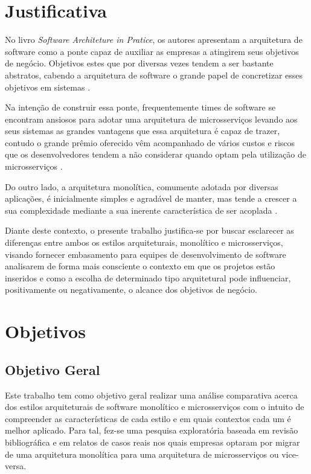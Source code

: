 \section{Justificativa}
\label{justificativa}

No livro \textit{Software Architeture in Pratice}, os autores 
apresentam a arquitetura de software como a ponte capaz de auxiliar as empresas a atingirem seus
objetivos de negócio. Objetivos estes que por diversas vezes tendem a ser bastante abstratos,
cabendo a arquitetura de software o grande papel de concretizar esses objetivos em sistemas
\cite{Bass2015:SoftwareArchitetureInPratice}.

Na intenção de construir essa ponte, frequentemente times de software se encontram ansiosos para
adotar uma arquitetura de microsserviços levando aos seus sistemas as grandes vantagens que essa
arquitetura é capaz de trazer, contudo o grande prêmio oferecido vêm acompanhado de vários custos e
riscos que os desenvolvedores tendem a não considerar quando optam pela utilização de
microsserviços \cite{MartinFowler:MicroservicePremium}.

Do outro lado, a arquitetura monolítica, comumente adotada por diversas aplicações, é inicialmente
simples e agradável de manter, mas tende a crescer a sua complexidade mediante a sua inerente
característica de ser acoplada \cite{StefanTilkov:DontStartWithAMonolith}.

Diante deste contexto, o presente trabalho justifica-se por buscar esclarecer as diferenças entre
ambos os estilos arquiteturais, monolítico e microsserviços, visando fornecer embasamento para equipes
de desenvolvimento de software analisarem de forma mais consciente o contexto em que os projetos
estão inseridos e como a escolha de determinado tipo arquitetural pode influenciar, positivamente ou
negativamente, o alcance dos objetivos de negócio.

\section{Objetivos}
\label{sec:Objetivos}

\subsection{Objetivo Geral}
\label{sec:ObjetivoGeral}

Este trabalho tem como objetivo geral realizar uma análise comparativa acerca dos estilos
arquiteturais de software monolítico e microsserviços com o intuito de compreender as
características de cada estilo e em quais contextos cada um é melhor aplicado. Para tal, fez-se
uma pesquisa exploratória baseada em revisão bibliográfica e em relatos de casos reais nos
quais empresas optaram por migrar de uma arquitetura monolítica para uma arquitetura de
microsserviços ou vice-versa.

